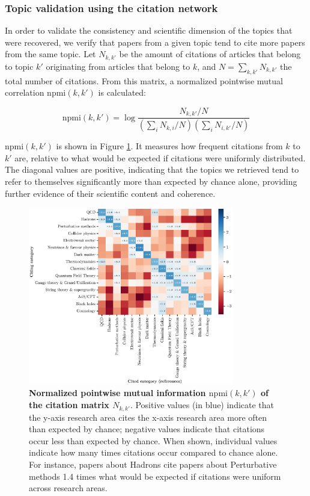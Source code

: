 \documentclass{article}
\begin{document}
\fontsize{6}{7}\selectfont\normalsize

\subsubsection{\label{appendix:citation_validation}Topic validation using the citation network}

In order to validate the consistency and scientific dimension of the topics that were recovered, we verify that papers from a given topic tend to cite more papers from the same topic. Let $N_{k,k'}$ be the amount of citations of articles that belong to topic $k'$ originating from articles that belong to $k$, and $N=\sum_{k,k'}N_{k,k'}$ the total number of citations. From this matrix, a normalized pointwise mutual correlation $\mathrm{npmi}(k,k')$ is calculated:

\begin{equation}
    \mathrm{npmi}(k,k') = \log {\dfrac{N_{k,k'}/N}{(\sum_{i} N_{k,i}/N)(\sum_{i} N_{i,k'}/N)}}
\end{equation}

$\mathrm{npmi}(k,k')$ is shown in Figure \ref{fig:topic_citation_matrix}. It measures how frequent citations from $k$ to $k'$ are, relative to what would be expected if citations were uniformly distributed. The diagonal values are positive, indicating that the topics we retrieved tend to refer to themselves significantly more than expected by chance alone, providing further evidence of their scientific content and coherence.

\begin{figure}[H]
    \centering
    \includegraphics[width=0.8\textwidth]{Fig13}
    \caption{\textbf{Normalized pointwise mutual information $\mathrm{npmi}(k,k')$ of the citation matrix $N_{k,k'}$}. Positive values (in blue) indicate that the y-axis research area cites the x-axis research area more often than expected by chance; negative values indicate that citations occur less than expected by chance. When shown, individual values indicate how many times citations occur compared to chance alone. For instance, papers about Hadrons cite papers about Perturbative methods 1.4 times what would be expected if citations were uniform across research areas.}
    \label{fig:topic_citation_matrix}
\end{figure}
\end{document}
